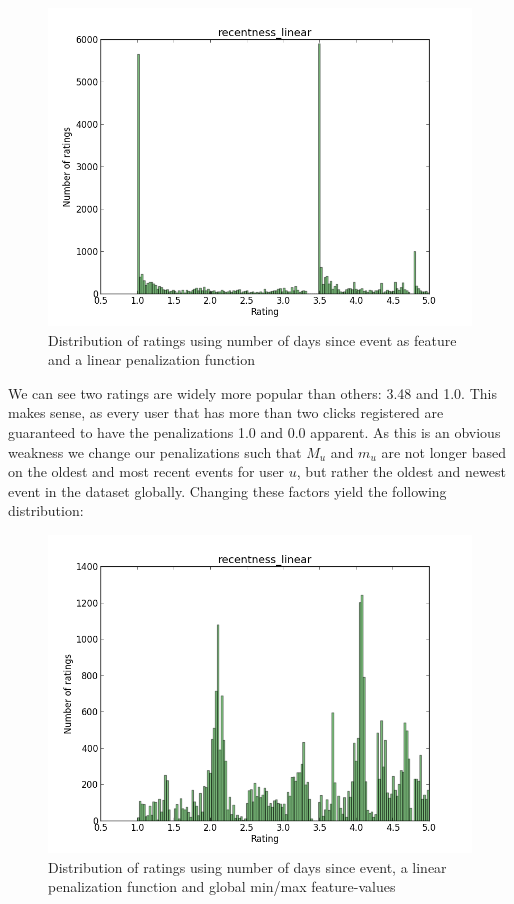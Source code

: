 \begin{figure}[H]
  \centering
  \includegraphics[scale=0.6]{image/dist-recentness-linear}
  \caption{Distribution of ratings using number of days since event as feature
  and a linear penalization function}
\end{figure}

We can see two ratings are widely more popular than others: 3.48 and 1.0. This
makes sense, as every user that has more than two clicks registered are
guaranteed to have the penalizations 1.0 and 0.0 apparent. As this is an
obvious weakness we change our penalizations such that $M_u$ and $m_u$ are not
longer based on the oldest and most recent events for user $u$, but rather the
oldest and newest event in the dataset globally. Changing these factors yield
the following distribution:

\begin{figure}[H]
  \centering
  \label{dist-recentness-linear-global}
  \includegraphics[scale=0.6]{image/dist-recentness-linear-global}
 \caption{Distribution of ratings using number of days since event, a linear
 penalization function and global min/max feature-values} 
\end{figure}

